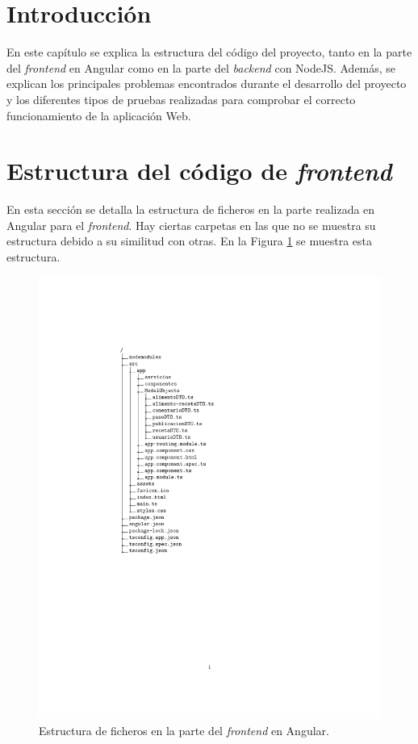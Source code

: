 \section{Introducción}
En este capítulo se explica la estructura del código del proyecto, tanto en la parte del \textit{frontend} en Angular como en la parte del \textit{backend} con NodeJS. Además, se explican los principales problemas encontrados durante el desarrollo del proyecto y los diferentes tipos de pruebas realizadas para comprobar el correcto funcionamiento de la aplicación Web.




\section{Estructura del código de \textit{frontend}}
En esta sección se detalla la estructura de ficheros en la parte realizada en Angular para el \textit{frontend}. Hay ciertas carpetas en las que no se muestra su estructura debido a su similitud con otras. En la Figura \ref{fig:dirtreeAngular} se muestra esta estructura.


\begin{figure}
    \centering
    \includegraphics{svg/dirtreefront.pdf}
    \caption{Estructura de ficheros en la parte del \textit{frontend} en Angular.}
    \label{fig:dirtreeAngular}
\end{figure}


